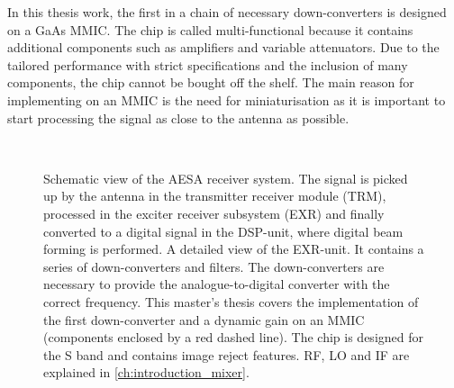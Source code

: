 		In this thesis work, the first in a chain of necessary down-converters is designed on a GaAs MMIC. The chip is called multi-functional because it contains additional components such as amplifiers and variable attenuators. Due to the tailored performance with strict specifications and the inclusion of many components, the chip cannot be bought off the shelf. The main reason for implementing on an MMIC is the need for miniaturisation as it is important to start processing the signal as close to the antenna as possible.

		\begin{figure}[hpt!]
			\centering
			\\
			\caption[AESA receiver system.]{Schematic view of the AESA receiver system.  The signal is picked up by the antenna in the transmitter receiver module (TRM), processed in the exciter receiver subsystem (EXR) and finally converted to a digital signal in the DSP-unit, where digital beam forming is performed.  A detailed view of the EXR-unit. It contains a series of down-converters and filters. The down-converters are necessary to provide the analogue-to-digital converter with the correct frequency. This master's thesis covers the implementation of the first down-converter and a dynamic gain on an MMIC (components enclosed by a red dashed line). The chip is designed for the S band and contains image reject features. RF, LO and IF are explained in  \ref{ch:introduction_mixer}.}\label{fig:intro_fig}
		\end{figure}



